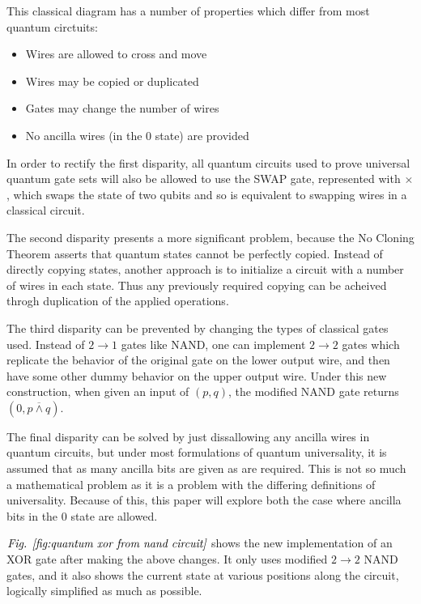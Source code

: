\documentclass[12pt]{article}
\newcommand{\nand}{\overline{\land}}
\begin{document}
This classical diagram has a number of properties which differ from most quantum circtuits:
\begin{itemize}
    \item Wires are allowed to cross and move
    \item Wires may be copied or duplicated
    \item Gates may change the number of wires
    \item No ancilla wires (in the 0 state) are provided
\end{itemize}
In order to rectify the first disparity, all quantum circuits used to prove universal quantum gate sets will also be allowed to use the SWAP gate, represented with $\times$, which swaps the state of two qubits and so is equivalent to swapping wires in a classical circuit.

The second disparity presents a more significant problem, because the No Cloning Theorem asserts that quantum states cannot be perfectly copied. Instead of directly copying states, another approach is to initialize a circuit with a number of wires in each state. Thus any previously required copying can be acheived throgh duplication of the applied operations.

The third disparity can be prevented by changing the types of classical gates used. Instead of $2 \to 1$ gates like NAND, one can implement $2 \to 2$ gates which replicate the behavior of the original gate on the lower output wire, and then have some other dummy behavior on the upper output wire. Under this new construction, when given an input of $(p, q)$, the modified NAND gate returns $(0, p \nand q)$.

The final disparity can be solved by just dissallowing any ancilla wires in quantum circuits, but under most formulations of quantum universality, it is assumed that as many ancilla bits are given as are required. This is not so much a mathematical problem as it is a problem with the differing definitions of universality. Because of this, this paper will explore both the case where ancilla bits in the 0 state are allowed.

$\emph{Fig. \ref{fig:quantum xor from nand circuit}}$ shows the new implementation of an XOR gate after making the above changes. It only uses modified $2 \to 2$ NAND gates, and it also shows the current state at various positions along the circuit, logically simplified as much as possible.
\end{document}
